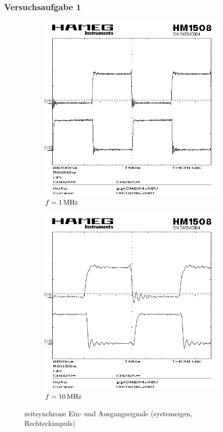 \documentclass[numbers=noenddot,12pt,a4paper]{scrartcl}
\begin{document}
\subsubsection{Versuchsaufgabe 1}
\begin{figure}[H]
\centering
\begin{subfigure}[b]{0.48\textwidth}
\includegraphics[width=\textwidth]{scr16.png}
\caption{$f=\unit[1]{MHz}$} \label{img:osz1}
\end{subfigure}
\begin{subfigure}[b]{0.48\textwidth}
\includegraphics[width=\textwidth]{scr17.png}
\caption{$f=\unit[10]{MHz}$} \label{img:osz2}
\end{subfigure}
\caption{zeitsynchrone Ein- und Ausgangssignale (systemeigen, Rechteckimpuls)}
\end{figure}
\end{document}
